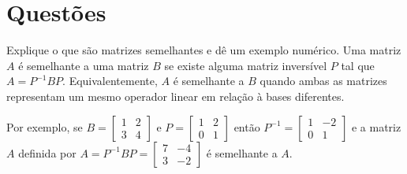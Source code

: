 \documentclass[12pt,a4paper]{article}
\begin{document}
\section*{Questões}
\begin{ExerciseList}
\Exercise[title={1,0}]
Explique o que são matrizes semelhantes e dê um exemplo numérico.
\Answer Uma matriz $A$ é semelhante a uma matriz $B$ se existe alguma matriz inversível $P$ tal que $A = P^{-1}BP$. Equivalentemente, $A$ é semelhante a $B$ quando ambas as matrizes representam um mesmo operador linear em relação à bases diferentes.

Por exemplo, se
$B=
\begin{bmatrix}
1 & 2 \\ 3 & 4
\end{bmatrix}$
e
$P=
\begin{bmatrix}
1 & 2 \\ 0 & 1
\end{bmatrix}$
então
$P^{-1}=
\begin{bmatrix}
1 & -2 \\ 0 & 1
\end{bmatrix}$
e a matriz $A$ definida por
$A = P^{-1} B P =
\begin{bmatrix}
7 & -4 \\ 3 & -2
\end{bmatrix}$
é semelhante a $A$.



\end{ExerciseList}
\end{document}
